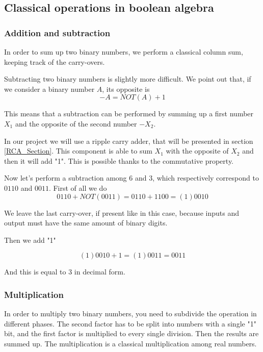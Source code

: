 \documentclass{article}
\begin{document}
\subsection{Classical operations in boolean algebra}

\subsubsection{Addition and subtraction}

In order to sum up two binary numbers, we perform a classical column sum, keeping track of the carry-overs.

\vspace{5mm}

Subtracting two binary numbers is slightly more difficult. We point out that, if we consider a binary number $A$, its opposite is
\[-A=NOT(A)+1\]

This means that a subtraction can be performed by summing up a first number $X_1$ and the opposite of the second number $-X_2$. 

\vspace{3mm}

In our project we will use a ripple carry adder, that will be presented in section \ref{RCA_Section}. This component is able to sum $X_1$ with the opposite of $X_2$ and then it will add "1". This is possible thanks to the commutative property.

\vspace{3mm}

Now let's perform a subtraction among $6$ and $3$, which respectively correspond to $0110$ and $0011$. First of all we do
\[0110+NOT(0011) = 0110 + 1100 = (1)0010\]

We leave the last carry-over, if present like in this case, because inputs and output must have the same amount of binary digits.

Then we add "1"

\[(1)0010+1=(1)0011 = 0011\]
  
And this is equal to 3 in decimal form.



\subsubsection{Multiplication}

In order to multiply two binary numbers, you need to subdivide the operation in different phases. The second factor has to be split into numbers with a single "1" bit, and the first factor is multiplied to every single division. Then the results are summed up. The multiplication is a classical multiplication among real numbers. 
\end{document}
